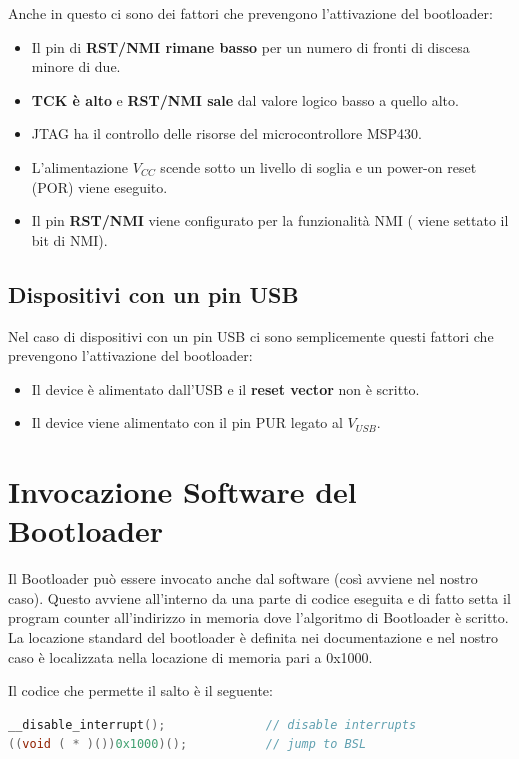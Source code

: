 \documentclass[LaM,binding=0.6cm]{../sapthesis}
\begin{document}
Anche in questo ci sono dei fattori che prevengono l’attivazione del bootloader:
\begin{itemize}
\item Il pin di \textbf{RST/NMI rimane basso} per un numero di fronti di discesa minore di due.
\item \textbf{TCK è alto} e \textbf{RST/NMI sale} dal valore logico basso a quello alto.
\item JTAG ha il controllo delle risorse del microcontrollore MSP430.
\item L’alimentazione $V_{CC}$ scende sotto un livello di soglia e un power-on reset (POR) viene eseguito.
\item Il pin \textbf{RST/NMI} viene configurato per la funzionalità NMI ( viene settato il bit di NMI).
\end{itemize}


\subsection{Dispositivi con un pin USB}

Nel caso di dispositivi con un pin USB ci sono semplicemente questi fattori che prevengono l’attivazione del bootloader:
\begin{itemize}
\item Il device è alimentato dall’USB e il \textbf{reset vector} non è scritto.
\item Il device viene alimentato con il pin PUR legato al \textbf{$V_{USB}$}.

\end{itemize}

\section{Invocazione Software del Bootloader}

Il Bootloader può essere invocato anche dal software (così avviene nel nostro caso).
Questo avviene all’interno da una parte di codice eseguita e di fatto setta il program counter all’indirizzo in memoria dove l’algoritmo di Bootloader è scritto. La locazione standard del bootloader è definita nei documentazione e nel nostro caso è localizzata nella locazione di memoria pari a 0x1000.

Il codice che permette il salto è il seguente:

\newline

\begin{lstlisting}[language=C]
__disable_interrupt();              // disable interrupts
((void ( * )())0x1000)();           // jump to BSL
\end{lstlisting}
\end{document}
